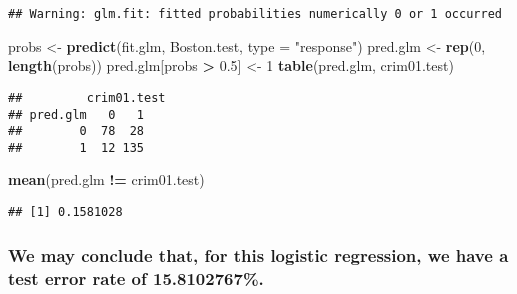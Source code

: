 \documentclass[]{article}
\newenvironment{Shaded}{\begin{snugshade}}{\end{snugshade}}
\newcommand{\KeywordTok}[1]{\textcolor[rgb]{0.13,0.29,0.53}{\textbf{#1}}}
\newcommand{\DataTypeTok}[1]{\textcolor[rgb]{0.13,0.29,0.53}{#1}}
\newcommand{\DecValTok}[1]{\textcolor[rgb]{0.00,0.00,0.81}{#1}}
\newcommand{\FloatTok}[1]{\textcolor[rgb]{0.00,0.00,0.81}{#1}}
\newcommand{\StringTok}[1]{\textcolor[rgb]{0.31,0.60,0.02}{#1}}
\newcommand{\OperatorTok}[1]{\textcolor[rgb]{0.81,0.36,0.00}{\textbf{#1}}}
\newcommand{\NormalTok}[1]{#1}
\begin{document}
\begin{verbatim}
## Warning: glm.fit: fitted probabilities numerically 0 or 1 occurred
\end{verbatim}

\begin{Shaded}
\begin{Highlighting}[]
\NormalTok{probs <-}\StringTok{ }\KeywordTok{predict}\NormalTok{(fit.glm, Boston.test, }\DataTypeTok{type =} \StringTok{"response"}\NormalTok{)}
\NormalTok{pred.glm <-}\StringTok{ }\KeywordTok{rep}\NormalTok{(}\DecValTok{0}\NormalTok{, }\KeywordTok{length}\NormalTok{(probs))}
\NormalTok{pred.glm[probs }\OperatorTok{>}\StringTok{ }\FloatTok{0.5}\NormalTok{] <-}\StringTok{ }\DecValTok{1}
\KeywordTok{table}\NormalTok{(pred.glm, crim01.test)}
\end{Highlighting}
\end{Shaded}

\begin{verbatim}
##         crim01.test
## pred.glm   0   1
##        0  78  28
##        1  12 135
\end{verbatim}

\begin{Shaded}
\begin{Highlighting}[]
\KeywordTok{mean}\NormalTok{(pred.glm }\OperatorTok{!=}\StringTok{ }\NormalTok{crim01.test)}
\end{Highlighting}
\end{Shaded}

\begin{verbatim}
## [1] 0.1581028
\end{verbatim}

\subsubsection{We may conclude that, for this logistic regression, we
have a test error rate of
15.8102767\%.}\label{we-may-conclude-that-for-this-logistic-regression-we-have-a-test-error-rate-of-15.8102767.}

\begin{Shaded}
\end{Shaded}
\end{document}
